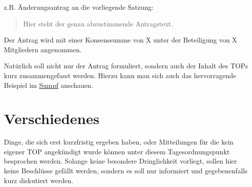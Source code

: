 \documentclass[fachschaft=mathphys]{mathphys/mathphys-protocol}
\newenvironment{antrag}{\begin{quote}\begin{itshape}}{\end{itshape}\end{quote}}
\begin{document}
z.B. Änderungsantrag an die vorliegende Satzung: %
\begin{antrag}
Hier steht der genau abzustimmende Antragstext. %
\end{antrag}
Der Antrag wird mit einer Konsenssumme von X unter der Beteiligung von
X Mitgliedern angenommen. %

Natürlich soll nicht nur der Antrag formuliert, sondern auch der Inhalt des
TOPs kurz zusammengefasst werden. Hierzu kann man sich auch das hervorragende
Beispiel im \href{https://mathphys.fsk.uni-heidelberg.de/svn/sumpf/fsr/vorlagen/beispiel-sitzungsprotokoll}{Sumpf}
anschauen.

\section{Verschiedenes}
Dinge, die sich erst kurzfristig ergeben haben, oder Mitteilungen für die kein
eigener TOP angekündigt wurde können unter diesem Tagesordnungspunkt besprochen
werden. Solange keine besondere Dringlichkeit vorliegt, sollen hier keine
Beschlüsse gefällt werden, sondern es soll nur informiert und gegebenenfalls
kurz diskutiert werden.

\lipsum\lipsum
\end{document}
